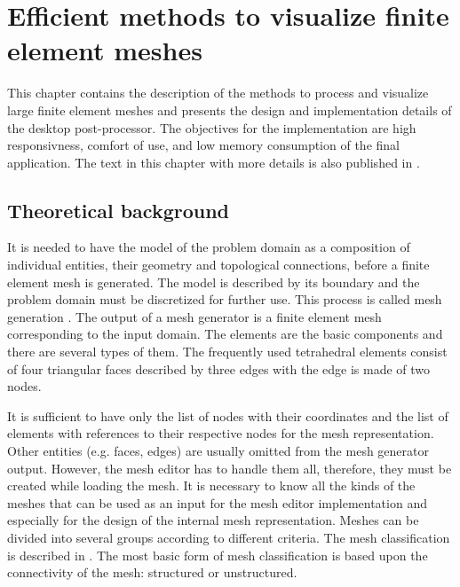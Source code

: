 \chapter{Efficient methods to visualize finite element meshes}
\label{chapter:mesh-visualization}

This chapter contains the description of the methods to process and visualize large finite element meshes and presents the design and implementation details of the desktop post-processor. The objectives for the implementation are high responsivness, comfort of use, and low memory consumption of the final application. The text in this chapter with more details is also published in \cite{Benes2015}.


\section{Theoretical background}

It is needed to have the model of the problem domain as a composition of individual entities, their geometry and topological connections, before a finite element mesh is generated. The model is described by its boundary and the problem domain must be discretized for further use. This process is called mesh generation \cite{Frey2000, Rypl1998}. The output of a mesh generator is a finite element mesh corresponding to the input domain. The elements are the basic components and there are several types of them. The frequently used tetrahedral elements consist of four triangular faces described by three edges with the edge is made of two nodes.

It is sufficient to have only the list of nodes with their coordinates and the list of elements with references to their respective nodes for the mesh representation. Other entities (e.g. faces, edges) are usually omitted from the mesh generator output. However, the mesh editor has to handle them all, therefore, they must be created while loading the mesh. It is necessary to know all the kinds of the meshes that can be used as an input for the mesh editor implementation and especially for the design of the internal mesh representation. Meshes can be divided into several groups according to different criteria. The mesh classification is described in \cite{Hoppe1996}. The most basic form of mesh classification is based upon the connectivity of the mesh: structured or unstructured.

